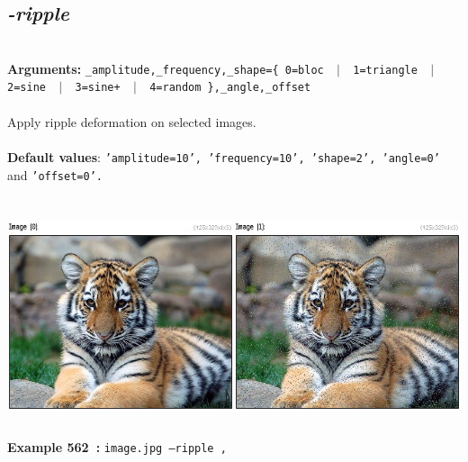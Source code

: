 \documentclass[a4paper,11pt,twoside]{book}
\begin{document}
\subsection{\emph{-ripple} }\vspace*{-0.5em}
~\\\textbf{Arguments: } 
{\small \texttt{\_amplitude,\_frequency,\_shape=\{ 0=bloc ~$|$~ 1=triangle ~$|$~ 2=sine ~$|$~ 3=sine+ ~$|$~ 4=random \},\_angle,\_offset}}\\~\\
Apply ripple deformation on selected images.
~\\~\\\textbf{Default values}: {\small \texttt{'amplitude=10', 'frequency=10', 'shape=2', 'angle=0'} and \texttt{'offset=0'.}}
\begin{center}\includegraphics[keepaspectratio=true,height=7cm,width=\textwidth]{img/gmic_def562.jpg}\\
{\footnotesize \textbf{Example 562~:} \texttt{image.jpg --ripple ,}}
\end{center}
\end{document}
